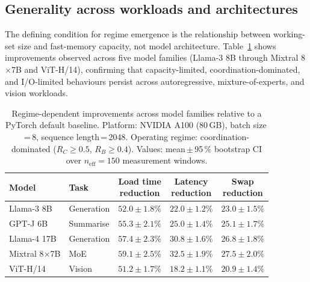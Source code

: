 \subsection{Generality across workloads and architectures}
\label{sec:generality}

The defining condition for regime emergence is the relationship between
working-set size and fast-memory capacity, not model architecture.
Table~\ref{tab:cross-model} shows improvements observed across five model
families (Llama-3 8B through Mixtral 8$\times$7B and ViT-H/14), confirming
that capacity-limited, coordination-dominated, and I/O-limited behaviours persist
across autoregressive, mixture-of-experts, and vision workloads.

\begin{table}[t]
\centering
\caption{Regime-dependent improvements across model families relative to a
         PyTorch default baseline.
         Platform: NVIDIA A100 (80\,GB), batch size\,=\,8, sequence length\,=\,2048.
         Operating regime: coordination-dominated ($R_C \geq 0.5$, $R_B \geq 0.4$).
         Values: mean\,$\pm$\,95\,\% bootstrap CI over $n_{\mathrm{eff}}\!=\!150$
         measurement windows.}
\label{tab:cross-model}
\renewcommand{\arraystretch}{1.2}
\footnotesize
\begin{tabular}{llccc}
\toprule
\textbf{Model} & \textbf{Task} &
  \makecell{\textbf{Load time}\\\textbf{reduction}} &
  \makecell{\textbf{Latency}\\\textbf{reduction}} &
  \makecell{\textbf{Swap}\\\textbf{reduction}} \\
\midrule
Llama-3 8B          & Generation & $52.0 \pm 1.8\%$ & $22.0 \pm 1.2\%$ & $23.0 \pm 1.5\%$ \\
GPT-J 6B            & Summarise  & $55.3 \pm 2.1\%$ & $25.0 \pm 1.4\%$ & $25.1 \pm 1.7\%$ \\
Llama-4 17B         & Generation & $57.4 \pm 2.3\%$ & $30.8 \pm 1.6\%$ & $26.8 \pm 1.8\%$ \\
Mixtral 8$\times$7B & MoE        & $59.1 \pm 2.5\%$ & $32.5 \pm 1.9\%$ & $27.5 \pm 2.0\%$ \\
ViT-H/14            & Vision     & $51.2 \pm 1.7\%$ & $18.2 \pm 1.1\%$ & $20.9 \pm 1.4\%$ \\
\bottomrule
\end{tabular}
\end{table}

